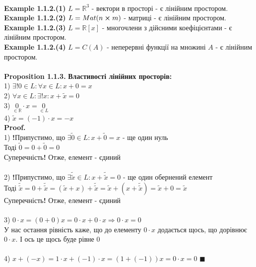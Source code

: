 \documentclass[a4paper, 14pt]{extarticle}
\def\ex#1{\textbf{Example {#1}}}
\def\prp#1{\textbf{Proposition {#1}}}
\def\proof{\textbf{Proof.}\\}
\def\bigline{\vspace{5mm}\\}
\def\qed{$\blacksquare$}
\begin{document}
	\bigline
	 \ex{1.1.2.(1)} $L = \mathbb{R}^3$ - вектори в просторі - є лінійним простором.\\
	 \ex{1.1.2.(2)} $L = Mat(n \cross m)$ - матриці - є лінійним простором.\\
	 \ex{1.1.2.(3)} $L = \mathbb{R}[x]$ - многочлени з дійсними коефіцієнтами - є лінійним простором.\\
	\ex{1.1.2.(4)} $L = C(A)$ - неперервні функції на множині $A$ - є лінійним простором.\\
	\bigline
	\prp{1.1.3.} \textbf{Властивості лінійних просторів:}\\
	1) $\exists !0 \in L: \forall x \in L: x + 0 = x$\\
	2) $\forall x \in L: \exists! x: x + \tilde{x} = 0$\\
	3) $\underset{\in \mathbb{R}}{0} \cdot x = \underset{\in L}{0}$\\
	4) $\tilde{x} = (-1) \cdot x = -x$\\
	\proof
	1) \textbf{!}Припустимо, що $\exists \tilde{0} \in L: x + \tilde{0} = x$ - ще один нуль\\
	Тоді $\tilde{0} = 0 + \tilde{0} = 0$\\
	Суперечність\textbf{!} Отже, елемент - єдиний\\
	\\
	2) \textbf{!}Припустимо, що $\exists \tilde{\tilde{x}} \in L: x + \tilde{\tilde{x}} = 0$ - ще один обернений елемент\\
	Тоді $\tilde{\tilde{x}} = 0 + \tilde{\tilde{x}} = (\tilde{x} + x) + \tilde{\tilde{x}} = \tilde{x} + (x + \tilde{\tilde{x}}) = \tilde{x} + 0 = \tilde{x}$\\
	Суперечність\textbf{!} Отже, елемент - єдиний\\
	\\
	3) $0 \cdot x = (0 + 0)x = 0\cdot x + 0 \cdot x \Rightarrow 0 \cdot x = 0$\\
	У нас остання рівність каже, що до елементу $0 \cdot x$ додається щось, що дорівнює $0 \cdot x$. І ось це щось буде рівне $0$ \\
	\\
	4) $x + (-x) = 1 \cdot x + (-1) \cdot x = (1 + (-1))x = 0 \cdot x = 0$ \qed
	\\
	
\end{document}
